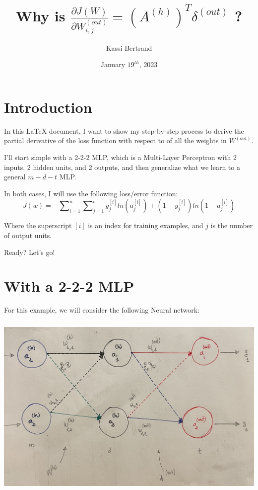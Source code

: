 \documentclass[12pt, letterpaper]{article}
\title{Why is $ \frac{\partial J(W)}{\partial W_{i,j}^{(out)}} = (A^{(h)})^{T} \delta^{(out)}$ ?}
\author{Kassi Bertrand}
\date{January $19^{th}$, 2023}
\begin{document}
\maketitle

\section{Introduction}
In this \LaTeX{} document, I want to show my step-by-step process
to derive the partial derivative of the loss function with respect
to of all the weights in $W^{(out)}$.

\vspace{5mm} %

I'll start simple with a 2-2-2 MLP, which is a Multi-Layer Perceptron
with 2 inputs, 2 hidden units, and 2 outputs, and then generalize
what we learn to a general $m-d-t$ MLP.

\vspace{5mm} %

In both cases, I will use the following loss/error function:
\[J(w) = -\sum\nolimits_{i = 1}^{n}\sum\nolimits_{j=1}^{t} y_j^{[i]} ln(a_j^{[i]}) + (1 - y_j^{[i]})ln(1 - a_j^{[i]})\]

Where the superscript $[i]$ is an index for training examples,
and $j$ is the number of output units.

\vspace{5mm} %

Ready? Let's go!

\pagebreak
\section{With a 2-2-2 MLP}

For this example, we will consider the following Neural network:

\begin{center}
    \includegraphics[width = 16cm, height = 9cm]{2-2-2-mlp.jpg}
\end{center}
\end{document}
